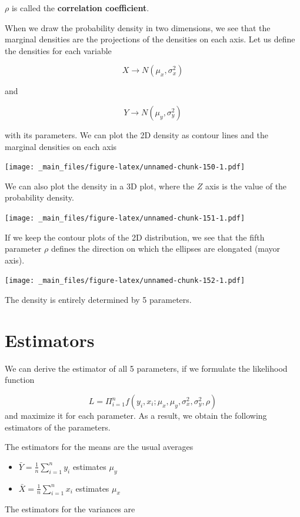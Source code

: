 \documentclass[
]{book}
\providecommand{\tightlist}{%
  \setlength{\itemsep}{0pt}\setlength{\parskip}{0pt}}
\begin{document}
\(\rho\) is called the \textbf{correlation coefficient}.

When we draw the probability density in two dimensions, we see that the marginal densities are the projections of the densities on each axis. Let us define the densities for each variable

\[X \rightarrow N(\mu_x, \sigma_x^2)\]

and

\[Y \rightarrow N(\mu_y, \sigma_y^2)\]

with its parameters. We can plot the 2D density as contour lines and the marginal densities on each axis

\texttt{[image: \_main\_files/figure-latex/unnamed-chunk-150-1.pdf]}

We can also plot the density in a 3D plot, where the \(Z\) axis is the value of the probability density.

\texttt{[image: \_main\_files/figure-latex/unnamed-chunk-151-1.pdf]}

If we keep the contour plots of the 2D distribution, we see that the fifth parameter \(\rho\) defines the direction on which the ellipses are elongated (mayor axis).

\texttt{[image: \_main\_files/figure-latex/unnamed-chunk-152-1.pdf]}

The density is entirely determined by 5 parameters.

\hypertarget{estimators}{%
\section{Estimators}\label{estimators}}

We can derive the estimator of all 5 parameters, if we formulate the likelihood function

\[L=\Pi_{i=1}^n f(y_i,x_i; \mu_x, \mu_y, \sigma^2_x, \sigma_y^2, \rho)\]
and maximize it for each parameter. As a result, we obtain the following estimators of the parameters.

The estimators for the means are the usual averages

\begin{itemize}
\tightlist
\item
  \(\bar{Y}=\frac{1}{n}\sum_{i=1}^n y_i\) estimates \(\mu_y\)
\item
  \(\bar{X}=\frac{1}{n}\sum_{i=1}^n x_i\) estimates \(\mu_x\)
\end{itemize}

The estimators for the variances are
\end{document}
